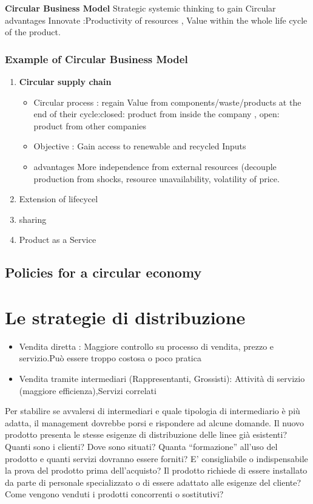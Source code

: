 \documentclass{article}
\begin{document}
\textbf{Circular Business Model}
Strategic systemic thinking to gain Circular advantages
Innovate :Productivity of resources ,
Value within the whole life cycle of the product.

\subsubsection{Example of Circular Business Model}
\begin{enumerate}
\item \textbf{Circular supply chain }
	\begin{itemize}
		\item Circular process : regain Value from components/waste/products at
		the end of their cycle:closed: product from inside the
		company , open: product from other companies
		\item Objective : Gain access to renewable and recycled
		Inputs
		\item advantages
		More independence from external
		resources (decouple production from
		shocks, resource unavailability,
		volatility of price.
	\end{itemize}
	\item  Extension of lifecycel
	\item sharing 
	\item Product as a Service
\end{enumerate}

\subsection{Policies for a circular economy}

\section{Le strategie di distribuzione}
\begin{itemize}
	\item Vendita diretta : Maggiore controllo su
	processo
	di vendita, prezzo e servizio.Può essere troppo costosa o
	poco pratica
	\item Vendita tramite
	intermediari (Rappresentanti, Grossisti): Attività di servizio (maggiore
	efficienza),Servizi correlati
\end{itemize}

Per stabilire se avvalersi di intermediari e quale tipologia di
intermediario è più adatta, il management dovrebbe porsi e
rispondere ad alcune domande.
Il nuovo prodotto presenta le stesse esigenze di
distribuzione delle linee già esistenti?
Quanti sono i clienti? Dove sono situati? Quanta
“formazione” all’uso del prodotto e quanti servizi
dovranno essere forniti? E’ consigliabile o indispensabile
la prova del prodotto prima dell’acquisto? Il prodotto
richiede di essere installato da parte di personale
specializzato o di essere adattato alle esigenze del
cliente?
Come vengono venduti i prodotti concorrenti o sostitutivi?
\end{document}
